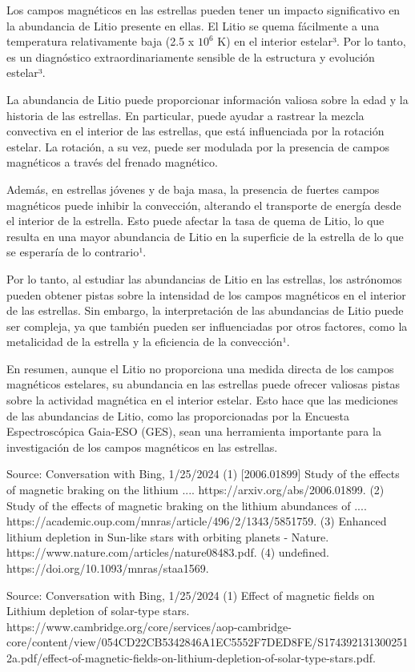 Los campos magnéticos en las estrellas pueden tener un impacto significativo en la abundancia de Litio presente en ellas. El Litio se quema fácilmente a una temperatura relativamente baja (2.5 x $10^6$ K) en el interior estelar³. Por lo tanto, es un diagnóstico extraordinariamente sensible de la estructura y evolución estelar³.

La abundancia de Litio puede proporcionar información valiosa sobre la edad y la historia de las estrellas. En particular, puede ayudar a rastrear la mezcla convectiva en el interior de las estrellas, que está influenciada por la rotación estelar. La rotación, a su vez, puede ser modulada por la presencia de campos magnéticos a través del frenado magnético.

Además, en estrellas jóvenes y de baja masa, la presencia de fuertes campos magnéticos puede inhibir la convección, alterando el transporte de energía desde el interior de la estrella. Esto puede afectar la tasa de quema de Litio, lo que resulta en una mayor abundancia de Litio en la superficie de la estrella de lo que se esperaría de lo contrario¹.

Por lo tanto, al estudiar las abundancias de Litio en las estrellas, los astrónomos pueden obtener pistas sobre la intensidad de los campos magnéticos en el interior de las estrellas. Sin embargo, la interpretación de las abundancias de Litio puede ser compleja, ya que también pueden ser influenciadas por otros factores, como la metalicidad de la estrella y la eficiencia de la convección¹.

En resumen, aunque el Litio no proporciona una medida directa de los campos magnéticos estelares, su abundancia en las estrellas puede ofrecer valiosas pistas sobre la actividad magnética en el interior estelar. Esto hace que las mediciones de las abundancias de Litio, como las proporcionadas por la Encuesta Espectroscópica Gaia-ESO (GES), sean una herramienta importante para la investigación de los campos magnéticos en las estrellas.

Source: Conversation with Bing, 1/25/2024
(1) [2006.01899] Study of the effects of magnetic braking on the lithium .... https://arxiv.org/abs/2006.01899.
(2) Study of the effects of magnetic braking on the lithium abundances of .... https://academic.oup.com/mnras/article/496/2/1343/5851759.
(3) Enhanced lithium depletion in Sun-like stars with orbiting planets - Nature. https://www.nature.com/articles/nature08483.pdf.
(4) undefined. https://doi.org/10.1093/mnras/staa1569.

Source: Conversation with Bing, 1/25/2024
(1) Effect of magnetic fields on Lithium depletion of solar-type stars. https://www.cambridge.org/core/services/aop-cambridge-core/content/view/054CD22CB5342846A1EC5552F7DED8FE/S1743921313002512a.pdf/effect-of-magnetic-fields-on-lithium-depletion-of-solar-type-stars.pdf.




